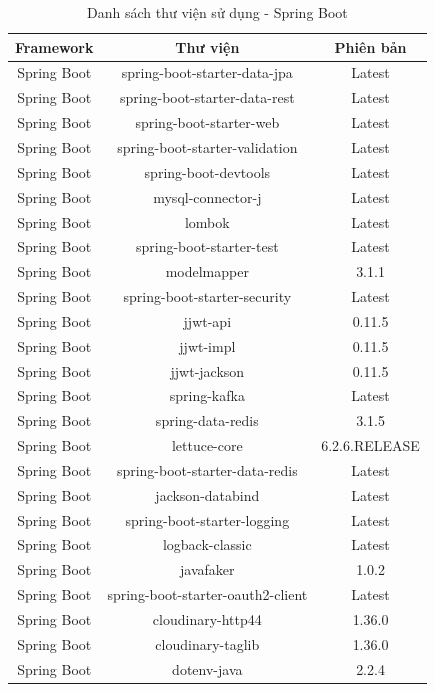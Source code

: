 \documentclass[../DoAn.tex]{subfiles}
\begin{document}
    \begin{table}[H]
    \centering{}
        \begin{tabular}{|c|c|c|}
        \hline
        \textbf{Framework} & \textbf{Thư viện} & \textbf{Phiên bản} \\
        \hline
        Spring Boot & spring-boot-starter-data-jpa & Latest \\
        \hline
        Spring Boot & spring-boot-starter-data-rest & Latest \\
        \hline
        Spring Boot & spring-boot-starter-web & Latest \\
        \hline
        Spring Boot & spring-boot-starter-validation & Latest \\
        \hline
        Spring Boot & spring-boot-devtools & Latest \\
        \hline
        Spring Boot & mysql-connector-j & Latest \\
        \hline
        Spring Boot & lombok & Latest \\
        \hline
        Spring Boot & spring-boot-starter-test & Latest \\
        \hline
        Spring Boot & modelmapper & 3.1.1 \\
        \hline
        Spring Boot & spring-boot-starter-security & Latest \\
        \hline
        Spring Boot & jjwt-api & 0.11.5 \\
        \hline
        Spring Boot & jjwt-impl & 0.11.5 \\
        \hline
        Spring Boot & jjwt-jackson & 0.11.5 \\
        \hline
        Spring Boot & spring-kafka & Latest \\
        \hline
        Spring Boot & spring-data-redis & 3.1.5 \\
        \hline
        Spring Boot & lettuce-core & 6.2.6.RELEASE \\
        \hline
        Spring Boot & spring-boot-starter-data-redis & Latest \\
        \hline
        Spring Boot & jackson-databind & Latest \\
        \hline
        Spring Boot & spring-boot-starter-logging & Latest \\
        \hline
        Spring Boot & logback-classic & Latest \\
        \hline
        Spring Boot & javafaker & 1.0.2 \\
        \hline
        Spring Boot & spring-boot-starter-oauth2-client & Latest \\
        \hline
        Spring Boot & cloudinary-http44 & 1.36.0 \\
        \hline
        Spring Boot & cloudinary-taglib & 1.36.0 \\
        \hline
        Spring Boot & dotenv-java & 2.2.4 \\
        \hline
        \end{tabular}
        \caption{Danh sách thư viện sử dụng - Spring Boot}
        \label{table:libraries_used_java}
    \end{table}
\end{document}
